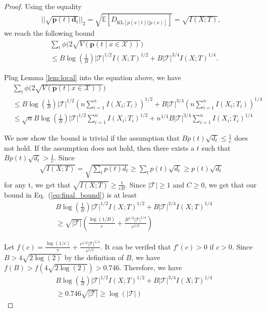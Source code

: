 \documentclass{article} \usepackage{iclr2021_conference,times}
\newcommand{\E}{\mathbb{E}}
\theoremstyle{definition}
\theoremstyle{remark}
\begin{document}
\begin{proof}
Using the equality
\begin{align}
    || \sqrt{\mathbf{p}(t) {\mathbf{d}_t}}||_2 = \sqrt{\E[D_{\text{KL}[p(x \mid t) || p(x)]}]} = \sqrt{I(X;T)},
\end{align}
we reach the following bound
\begin{align}
    \label{eq:final_bound}
     &\sum_t \phi \big( 2\sqrt{V(\mathbf{p}(t \mid x \in \mathcal{X}))} \big) \\
     &\le  B\log(\frac{1}{B}) |\mathcal{T}|^{1/2} I(X;T)^{1/2}  + B |\mathcal{T}|^{3/4} I(X;T)^{1/4}.
\end{align}

Plug Lemma \ref{lem:local} into the equation above, we have
\begin{align}
       \label{eq:benign_bound}
         &\sum_t \phi \big( 2\sqrt{V(\mathbf{p}(t \mid x \in \mathcal{X}))} \big) \\
     &\le  B\log(\frac{1}{B})|\mathcal{T}|^{1/2} (n\sum_{i=1}^n{I(X_i; T_i)})^{1/2}  + B |\mathcal{T}|^{3/4}(n\sum_{i=1}^n{I(X_i; T_i)})^{1/4} \\
     &\le \sqrt{n}B\log(\frac{1}{B}) |\mathcal{T}|^{1/2} \sum_{i=1}^n I(X_i; T_i)^{1/2} + n^{1/4} B |\mathcal{T}|^{3/4}\sum_{i=1}^n I(X_i; T_i)^{1/4}
\end{align}

We now show the bound is trivial if the assumption that $Bp(t) \sqrt{d_t} \le \frac{1}{e}$ does not hold. If the assumption does not hold, then there exists a $t$ such that $Bp(t) \sqrt{d_t} > \frac{1}{e}$. Since
\begin{align}
    \sqrt{I(X;T)} = \sqrt{\sum_t p(t)d_t} \ge \sum_t p(t)\sqrt{d_t} \ge p(t)\sqrt{d_t}
\end{align}
for any t, we get that $\sqrt{I(X;T)} \ge \frac{1}{eB}.$ Since $|\mathcal{T}| \ge 1$ and $C \ge 0$, we get that our bound in Eq.~(\ref{eq:final_bound}) is at least 
\begin{align}
     & B\log(\frac{1}{B}) |\mathcal{T}|^{1/2} I(X;T)^{1/2}  + B |\mathcal{T}|^{3/4} I(X;T)^{1/4} \\
     &\ge \sqrt{|\mathcal{T}|}(\frac{\log(1/B)}{e} + \frac{B^{1/2} |\mathcal{T}|^{1/4}}{e^{1/2}})
\end{align}

Let $f(c) = \frac{\log(1/c)}{e} + \frac{c^{1/2} |\mathcal{T}|^{1/4}}{e^{1/2}}$. It can be verifed that $f'(c) > 0$ if $c > 0$. Since $B > 4\sqrt{2\log(2)}$ by the definition of $B$, we have $f(B) > f(4\sqrt{2\log(2)}) > 0.746. $ Therefore, we have 
\begin{align}
       & B\log(\frac{1}{B}) |\mathcal{T}|^{1/2} I(X;T)^{1/2}  + B |\mathcal{T}|^{3/4} I(X;T)^{1/4} \\
       & \ge 0.746 \sqrt{|\mathcal{T}|} \ge \log(|\mathcal{T}|)
\end{align}


\end{proof}
\end{document}
